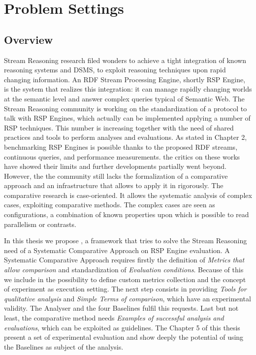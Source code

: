 \chapter{Problem Settings}

\section{Overview}

Stream Reasoning research filed wonders to achieve a tight integration of known reasoning systems and DSMS, to exploit reasoning techniques upon rapid changing information. An RDF Stream Processing Engine, shortly RSP Engine, is the system that realizes this integration: it can  manage rapidly changing worlds at the semantic level and answer complex queries typical of Semantic Web. The Stream Reasoning community is working on the standardization of a protocol to talk with RSP Engines, which actually can be implemented applying a number of RSP techniques. This number is increasing together with the need of shared practices and tools to perform analyses and evaluations. As stated in Chapter 2, benchmarking RSP Engines is possible thanks to the proposed RDF streams, continuous queries, and performance measurements. the critics on these works have showed their limits and further developments partially went beyond. However, the the community still lacks the formalization of a comparative approach and an infrastructure that allows to apply it in rigorously.
The comparative research is case-oriented. It allows the systematic analysis of complex cases, exploiting comparative methods. The complex cases are seen as configurations, a combination of known properties upon which is possible to read parallelism or contrasts.

In this thesis we propose \namens, a framework that tries to solve the Stream Reasoning need of a Systematic Comparative Approach on RSP Engine evaluation. A Systematic Comparative Approach requires firstly the definition of \textit{Metrics that allow comparison} and standardization of \textit{Evaluation conditions}. Because of this we include in \name the possibility  to define custom metrics collection and the concept of experiment as execution setting. The next step consists in providing \textit{Tools for qualitative analysis} and \textit{Simple Terms of comparison}, which have an experimental validity. The Analyser and the four Baselines fulfil this requests. Last but not least, the comparative method needs \textit{Examples of successful analysis and evaluations}, which can be exploited as guidelines. The Chapter 5 of this thesis present a set of experimental evaluation and show deeply the potential of \name using the Baselines as subject of the analysis.

